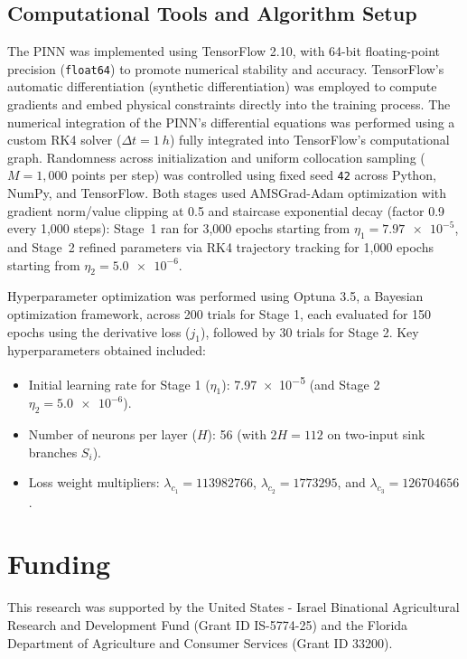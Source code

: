 \documentclass[pdflatex,sn-nature]{sn-jnl}%
\theoremstyle{thmstyleone}%
\theoremstyle{thmstyletwo}%
\theoremstyle{thmstylethree}%
\begin{document}
\subsection{Computational Tools and Algorithm Setup}
The PINN was implemented using TensorFlow 2.10, with 64-bit floating-point precision (\texttt{float64}) to promote numerical stability and accuracy. TensorFlow’s automatic differentiation (synthetic differentiation) was employed to compute gradients and embed physical constraints directly into the training process.
The numerical integration of the PINN’s differential equations was performed using a custom RK4 solver (\(\Delta t = \SI{1}{h}\)) fully integrated into TensorFlow’s computational graph. Randomness across initialization and uniform collocation sampling (\(M = 1{,}000\) points per step) was controlled using fixed seed \texttt{42} across Python, NumPy, and TensorFlow. Both stages used AMSGrad-Adam optimization with gradient norm/value clipping at 0.5 and staircase exponential decay (factor 0.9 every 1,000 steps): Stage~1 ran for 3,000 epochs starting from \(\eta_1 = \num{7.97e-5}\), and Stage~2 refined parameters via RK4 trajectory tracking for 1,000 epochs starting from \(\eta_2 = \num{5.0e-6}\).

Hyperparameter optimization was performed using Optuna 3.5, a Bayesian optimization framework, across 200 trials for Stage 1, each evaluated for 150 epochs using the derivative loss ($j_1$), followed by 30 trials for Stage 2. Key hyperparameters obtained included:
\begin{itemize}
\item Initial learning rate for Stage 1 ($\eta_1$): \num{7.97e-5} (and Stage 2 $\eta_2 = \num{5.0e-6}$).
\item Number of neurons per layer ($H$): 56 (with $2H = 112$ on two-input sink branches $S_i$).
\item Loss weight multipliers: $\lambda_{c_1} = \num{113982766}$, $\lambda_{c_2} = \num{1773295}$, and $\lambda_{c_3} = \num{126704656}$.
\end{itemize}

\FloatBarrier

\section*{Funding}
This research was supported by the United States - Israel Binational Agricultural Research and Development Fund (Grant ID IS-5774-25) and the Florida Department of Agriculture and Consumer Services (Grant ID 33200).
\end{document}
